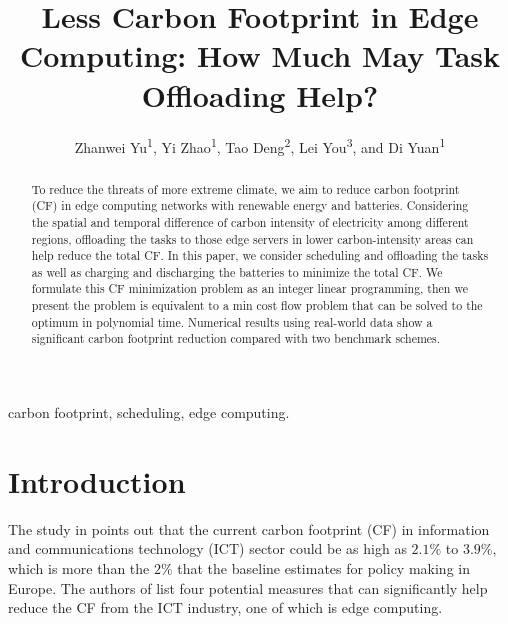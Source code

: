 \documentclass[conference, 10pt, ﬁnal, letterpaper, twocolumn]{IEEEtran}
\begin{document}
\title{Less Carbon Footprint in Edge Computing: How Much May Task Offloading Help?}
 
\author{Zhanwei Yu\textsuperscript{1}, Yi Zhao\textsuperscript{1}, Tao Deng\textsuperscript{2}, Lei You\textsuperscript{3}, and Di Yuan\textsuperscript{1}}


\renewcommand*{\Affilfont}{\small}

\maketitle

\begin{abstract}
To reduce the threats of more extreme climate, we aim to reduce carbon footprint (CF) in edge computing networks with renewable energy and batteries. Considering the spatial and temporal difference of carbon intensity of electricity among different regions, offloading the tasks to those edge servers in lower carbon-intensity areas can help reduce the total CF. In this paper, we consider scheduling and offloading the tasks as well as charging and discharging the batteries to minimize the total CF. We formulate this CF minimization problem as an integer linear programming, then we present the problem is equivalent to a min cost flow problem that can be solved to the optimum in polynomial time. Numerical results using real-world data show a significant carbon footprint reduction compared with two benchmark schemes.
\end{abstract}

\begin{IEEEkeywords}
carbon footprint, scheduling, edge computing.
\end{IEEEkeywords}


\section{Introduction}
The study in \cite{https://doi.org/10.48550/arxiv.2102.02622} points out that the current carbon footprint (CF) in information and communications technology (ICT) sector could be as high as $2.1\%$ to $3.9\%$, which is more than the $2\%$ that the baseline estimates for policy making in Europe. The authors of \cite{perrons2021digital} list four potential measures that can significantly help reduce the CF from the ICT industry, one of which is edge computing. 
\end{document}

